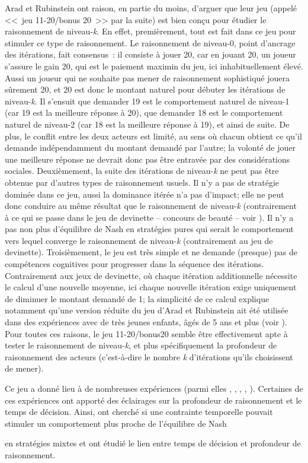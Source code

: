 \begin{Article}
\begin{refsection}[UmbhauerFR]
Arad et Rubinstein ont raison, en partie du moins, d'arguer que leur jeu
(appelé <<~jeu 11-20/bonus 20~>> par la suite) est bien conçu pour étudier le
raisonnement de niveau-\emph{k}. En effet, premièrement, tout est fait
dans ce jeu pour stimuler ce type de raisonnement. Le raisonnement de
niveau-0, point d'ancrage des itérations, fait consensus~: il consiste à
jouer 20, car en jouant 20, un joueur s'assure le gain 20, qui est le
paiement maximin du jeu, ici inhabituellement élevé. Aussi un joueur qui
ne souhaite pas mener de raisonnement sophistiqué jouera sûrement 20, et
20 est donc le montant naturel pour débuter les itérations de
niveau-\emph{k}. Il s'ensuit que demander 19 est le comportement naturel
de niveau-1 (car 19 est la meilleure réponse à 20), que demander 18 est
le comportement naturel de niveau-2 (car 18 est la meilleure réponse à
19), et ainsi de suite. De plus, le conflit entre les deux acteurs est
limité, au sens où chacun obtient ce qu'il demande indépendamment du
montant demandé par l'autre; la volonté de jouer une meilleure réponse
ne devrait donc pas être entravée par des considérations sociales.
Deuxièmement, la suite des itérations de niveau-\emph{k} ne peut pas
être obtenue par d'autres types de raisonnement usuels. Il n'y a pas de
stratégie dominée dans ce jeu, aussi la dominance itérée n'a pas
d'impact; elle ne peut donc conduire au même résultat que le
raisonnement de niveau-\emph{k} (contrairement à ce qui se passe dans le
jeu de devinette -- concours de beauté -- voir \textcite{nagel1995}). Il n'y a
pas non plus d'équilibre de Nash en stratégies pures qui serait le
comportement vers lequel converge le raisonnement de niveau-\emph{k}
(contrairement au jeu de devinette). Troisièmement, le jeu est très
simple et ne demande (presque) pas de compétences cognitives pour
progresser dans la séquence des itérations. Contrairement aux jeux de
devinette, où chaque itération additionnelle nécessite le calcul d'une
nouvelle moyenne, ici chaque nouvelle itération exige uniquement de
diminuer le montant demandé de 1; la simplicité de ce calcul explique
notamment qu'une version réduite du jeu d'Arad et Rubinstein ait été
utilisée dans des expériences avec de très jeunes enfants, âgés de 5 ans
et plus (voir \textcite{fe2022}). Pour toutes ces raisons, le jeu
11-20/bonus20 semble être effectivement apte à tester le raisonnement de
niveau-\emph{k}, et plus spécifiquement la profondeur de raisonnement
des acteurs (c'est-à-dire le nombre \emph{k} d'itérations qu'ils
choisissent de mener).

Ce jeu a donné lieu à de nombreuses expériences (parmi elles \textcite{arad2012}, \textcite{lindner2013}, \textcite{goeree2018}, \textcite{li2018}, \textcite{alosferrer2021}). Certaines de ces expériences ont apporté des éclairages sur la profondeur de raisonnement et le temps de décision. Ainsi, \textcite{lindner2013} ont cherché si une contrainte temporelle pouvait
stimuler un comportement plus proche de l'équilibre de Nash\linebreak\par
\pagebreak\noindent en
stratégies mixtes et \textcite{alosferrer2021} ont étudié
le lien entre temps de décision et profondeur de raisonnement.


\end{refsection}
\end{Article}

